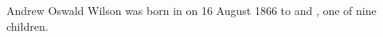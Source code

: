 
Andrew Oswald Wilson was born in  on 16 August 1866\cite{AOWisonBio}\cite{Argus1866Aug28}
to  and , one of nine children.
